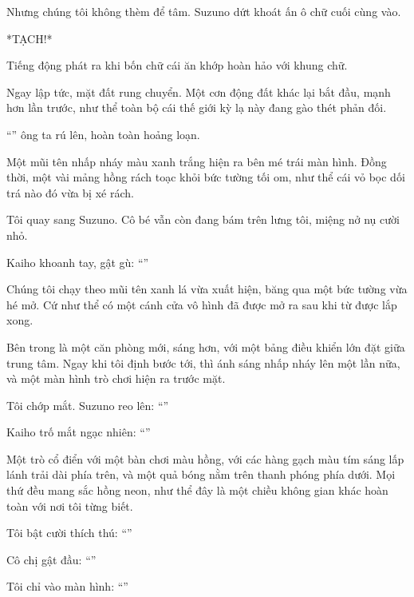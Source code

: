 \documentclass[../main.tex]{subfiles}
\begin{document}
Nhưng chúng tôi không thèm để tâm. Suzuno dứt khoát ấn ô chữ cuối cùng vào.

*TẠCH!*

Tiếng động phát ra khi bốn chữ cái ăn khớp hoàn hảo với khung chữ.

Ngay lập tức, mặt đất rung chuyển. Một cơn động đất khác lại bắt đầu, mạnh hơn lần trước, như thể toàn bộ cái thế giới kỳ lạ này đang gào thét phản đối.

``'' ông ta rú lên, hoàn toàn hoảng loạn.

Một mũi tên nhấp nháy màu xanh trắng hiện ra bên mé trái màn hình. Đồng thời, một vài mảng hồng rách toạc khỏi bức tường tối om, như thể cái vỏ bọc dối trá nào đó vừa bị xé rách.

Tôi quay sang Suzuno. Cô bé vẫn còn đang bám trên lưng tôi, miệng nở nụ cười nhỏ.

Kaiho khoanh tay, gật gù: ``''

Chúng tôi chạy theo mũi tên xanh lá vừa xuất hiện, băng qua một bức tường vừa hé mở. Cứ như thể có một cánh cửa vô hình đã được mở ra sau khi từ được lắp xong.

\ct

Bên trong là một căn phòng mới, sáng hơn, với một bảng điều khiển lớn đặt giữa trung tâm. Ngay khi tôi định bước tới, thì ánh sáng nhấp nháy lên một lần nữa, và một màn hình trò chơi hiện ra trước mặt.

Tôi chớp mắt. Suzuno reo lên: ``''

Kaiho trố mắt ngạc nhiên: ``''

Một trò cổ điển với một bàn chơi màu hồng, với các hàng gạch màu tím sáng lấp lánh trải dài phía trên, và một quả bóng nằm trên thanh phóng phía dưới. Mọi thứ đều mang sắc hồng neon, như thể đây là một chiều không gian khác hoàn toàn với nơi tôi từng biết.


Tôi bật cười thích thú: ``''

Cô chị gật đầu: ``''

Tôi chỉ vào màn hình: ``''
\end{document}
